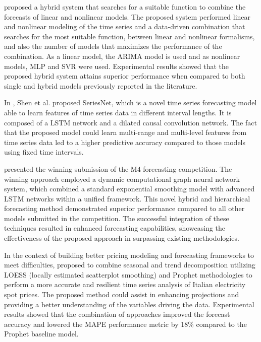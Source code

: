 \cite{DEOSANTOSJUNIOR201972} proposed a hybrid system that searches for a suitable function to combine the forecasts of linear and nonlinear models.
The proposed system performed linear and nonlinear modeling of the time series and a data-driven combination that searches for the most suitable function, between linear and nonlinear formalisms, and also the number of models that maximizes the performance of the combination.
As a linear model, the ARIMA model is used and as nonlinear models, MLP and SVR were used.
Experimental results showed that the proposed hybrid system attains superior performance when compared to both single and hybrid models previously reported in the literature.

In \cite{SHEN2020302}, Shen et al. proposed SeriesNet, which is a novel time series forecasting model able to learn features of time series data in different interval lengths.
It is composed of a LSTM network and a dilated causal convolution network.
The fact that the proposed model could learn multi-range and multi-level features from time series data led to a higher predictive accuracy compared to those models using fixed time intervals.

\cite{SMYL202075} presented the winning submission of the M4 forecasting competition.
The winning approach employed a dynamic computational graph neural network system, which combined a standard exponential smoothing model with advanced LSTM networks within a unified framework.
This novel hybrid and hierarchical forecasting method demonstrated superior performance compared to all other models submitted in the competition.
The successful integration of these techniques resulted in enhanced forecasting capabilities, showcasing the effectiveness of the proposed approach in surpassing existing methodologies.

In the context of building better pricing modeling and forecasting frameworks to meet difficulties, \cite{en16031371} proposed to combine seasonal and trend decomposition utilizing LOESS (locally estimated scatterplot smoothing) and Prophet methodologies to perform a more accurate and resilient time series analysis of Italian electricity spot prices.
The proposed method could assist in enhancing projections and providing a better understanding of the variables driving the data.
Experimental results showed that the combination of approaches improved the forecast accuracy and lowered the MAPE performance metric by 18\% compared to the Prophet baseline model.


\vspace{0.1 cm}
